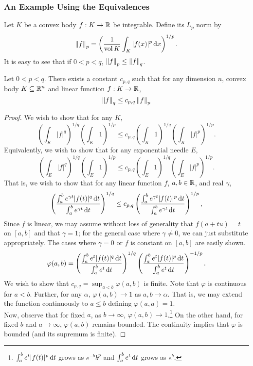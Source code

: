 \subsubsection{An Example Using the Equivalences}

Let $K$ be a convex body $f:K\to\mathbb{R}$ be integrable. Define its $L_p$ norm by
\[ \left\lVert f\right\rVert_p = \left(\frac{1}{\operatorname{vol} K} \int_{K} |f(x)|^p \operatorname{d}\!{x} \right)^{1/p}. \]
It is easy to see that if $0<p<q$, $\left\lVert f\right\rVert_p \leq \left\lVert f\right\rVert_q$.

\begin{theorem}
	Let $0<p<q$. There exists a constant $c_{p,q}$ such that for any dimension $n$, convex body $K\subseteq\mathbb{R}^n$ and linear function $f:K\to\mathbb{R}$,
	\[ \left\lVert f\right\rVert_q \leq c_{p,q}\left\lVert f\right\rVert_p \]
\end{theorem}
\begin{proof}
	We wish to show that for any $K$,
	\[ \left(\int_K |f|^q\right)^{1/q} \left(\int_K 1\right)^{1/p} \leq c_{p,q} \left(\int_K 1\right)^{1/q} \left(\int_K |f|^p\right)^{1/p}. \]
	Equivalently, we wish to show that for any exponential needle $E$,
	\[ \left(\int_E |f|^q\right)^{1/q} \left(\int_E 1\right)^{1/p} \leq c_{p,q} \left(\int_E 1\right)^{1/q} \left(\int_E |f|^p\right)^{1/p}. \]
	That is, we wish to show that for any linear function $f$, $a,b\in\mathbb{R}$, and real $\gamma$,
	\[ \left( \frac{\int_a^b e^{\gamma t} |f(t)|^q\operatorname{d}\!{t}}{\int_a^b e^{\gamma t}\operatorname{d}\!{t}} \right)^{1/q} \leq c_{p,q} \left( \frac{\int_a^b e^{\gamma t} |f(t)|^p\operatorname{d}\!{t}}{\int_a^b e^{\gamma t}\operatorname{d}\!{t}}\right)^{1/p}, \]
	Since $f$ is linear, we may assume without loss of generality that $f(a+tu)=t$ on $[a,b]$ and that $\gamma=1$; for the general case where $\gamma\neq 0$, we can just substitute appropriately. The cases where $\gamma=0$ or $f$ is constant on $[a,b]$ are easily shown.\\
	\[ \varphi(a,b) = \left( \frac{\int_a^b e^{t} |f(t)|^q\operatorname{d}\!{t}}{\int_a^b e^{t}\operatorname{d}\!{t}} \right)^{1/q} \left( \frac{\int_a^b e^{t} |f(t)|^p\operatorname{d}\!{t}}{\int_a^b e^{t}\operatorname{d}\!{t}} \right)^{-1/p}. \]
	We wish to show that $c_{p,q} = \sup_{a<b} \varphi(a,b)$ is finite. Note that $\varphi$ is continuous for $a<b$. Further, for any $\alpha$, $\varphi(a,b)\to 1$ as $a,b\to\alpha$. That is, we may extend the function continuously to $a\leq b$ defining $\varphi(a,a)=1$.\\
	Now, observe that for fixed $a$, as $b\to\infty$, $\varphi(a,b)\to 1$.\footnote{$\int_a^b e^t |f(t)|^p\operatorname{d}\!{t}$ grows as $e^{-b}b^p$ and $\int_a^b e^t\operatorname{d}\!{t}$ grows as $e^b$.} On the other hand, for fixed $b$ and $a\to\infty$, $\varphi(a,b)$ remains bounded. The continuity implies that $\varphi$ is bounded (and its supremum is finite).
\end{proof}

